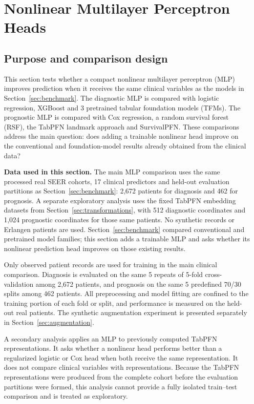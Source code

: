 \section{Nonlinear Multilayer Perceptron Heads}
\label{sec:mlp}

\subsection{Purpose and comparison design}

This section tests whether a compact nonlinear multilayer perceptron (MLP)
improves prediction when it receives the same clinical variables as the models
in Section~\ref{sec:benchmark}.  The diagnostic MLP is compared with logistic
regression, XGBoost and 3 pretrained tabular foundation models (TFMs).  The
prognostic MLP is compared with Cox regression, a random survival forest (RSF),
the TabPFN landmark approach and SurvivalPFN.  These comparisons address the
main question: does adding a trainable nonlinear head improve on the conventional
and foundation-model results already obtained from the clinical data?

\noindent\textbf{Data used in this section.} The main MLP comparison uses the
same processed real SEER cohorts, 17 clinical predictors and held-out evaluation
partitions as Section~\ref{sec:benchmark}: 2,672 patients for diagnosis and 462
for prognosis. A separate exploratory analysis uses the fixed TabPFN embedding
datasets from Section~\ref{sec:transformations}, with 512 diagnostic coordinates
and 1,024 prognostic coordinates for those same patients. No synthetic records
or Erlangen patients are used. Section~\ref{sec:benchmark} compared conventional
and pretrained model families; this section adds a trainable MLP and asks whether
its nonlinear prediction head improves on those existing results.

Only observed patient records are used for training in the main clinical
comparison.  Diagnosis
is evaluated on the same 5 repeats of 5-fold cross-validation among 2,672
patients, and prognosis on the same 5 predefined 70/30 splits among 462 patients.
All preprocessing and model fitting are confined to the training portion of
each fold or split, and performance is measured on the held-out real patients.
The synthetic augmentation experiment is presented separately in
Section~\ref{sec:augmentation}.

A secondary analysis applies an MLP to previously computed TabPFN
representations.  It asks whether a nonlinear head performs better than a
regularized logistic or Cox head when both receive the same representation.  It
does not compare clinical variables with representations.  Because the TabPFN
representations were produced from the complete cohort before the evaluation
partitions were formed, this analysis cannot provide a fully isolated
train--test comparison and is treated as exploratory.

